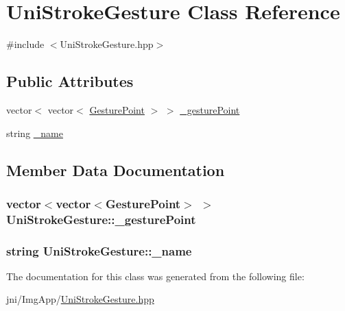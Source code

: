\hypertarget{class_uni_stroke_gesture}{\section{\-Uni\-Stroke\-Gesture \-Class \-Reference}
\label{class_uni_stroke_gesture}
}


{\ttfamily \#include $<$\-Uni\-Stroke\-Gesture.\-hpp$>$}

\subsection*{\-Public \-Attributes}
\begin{DoxyCompactItemize}
\item 
vector$<$ vector$<$ \hyperlink{class_gesture_point}{\-Gesture\-Point} $>$ $>$ \hyperlink{class_uni_stroke_gesture_a8cc074d20ec291f5339c6633457ac6d9}{\-\_\-gesture\-Point}
\item 
string \hyperlink{class_uni_stroke_gesture_adc3efd8fae4f164168e5e767d576c661}{\-\_\-name}
\end{DoxyCompactItemize}


\subsection{\-Member \-Data \-Documentation}
\hypertarget{class_uni_stroke_gesture_a8cc074d20ec291f5339c6633457ac6d9}{
\subsubsection[{\-\_\-gesture\-Point}]{\setlength{\rightskip}{0pt plus 5cm}vector$<$vector$<${\bf \-Gesture\-Point}$>$ $>$ {\bf \-Uni\-Stroke\-Gesture\-::\-\_\-gesture\-Point}}}\label{class_uni_stroke_gesture_a8cc074d20ec291f5339c6633457ac6d9}
\hypertarget{class_uni_stroke_gesture_adc3efd8fae4f164168e5e767d576c661}{
\subsubsection[{\-\_\-name}]{\setlength{\rightskip}{0pt plus 5cm}string {\bf \-Uni\-Stroke\-Gesture\-::\-\_\-name}}}\label{class_uni_stroke_gesture_adc3efd8fae4f164168e5e767d576c661}


\-The documentation for this class was generated from the following file\-:\begin{DoxyCompactItemize}
\item 
jni/\-Img\-App/\hyperlink{_uni_stroke_gesture_8hpp}{\-Uni\-Stroke\-Gesture.\-hpp}\end{DoxyCompactItemize}
